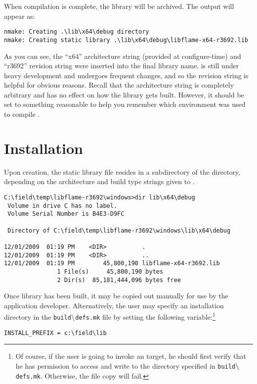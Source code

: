 \noindent
When compilation is complete, the library will be archived.
The output will appear as:

\begin{Verbatim}[frame=single,framesep=2.5mm,xleftmargin=5mm,fontsize=\footnotesize]
nmake: Creating .\lib\x64\debug directory
nmake: Creating static library .\lib\x64\debug\libflame-x64-r3692.lib
\end{Verbatim}

\noindent
As you can see, the ``x64'' architecture string (provided at configure-time)
and ``r3692'' revision string were inserted into the final library name.
\libflame is still under heavy development and undergoes frequent changes, and
so the revision string is helpful for obvious reasons.
Recall that the architecture string is completely arbitrary and has no effect
on how the library gets built.
However, it should be set to something reasonable to help you remember which
environment was used to compile \libflamens.


\section{Installation}


Upon creation, the static library file resides in a subdirectory of the \lib
directory, depending on the architecture and build type strings given to
\configurecmdns.

\begin{Verbatim}[frame=single,framesep=2.5mm,xleftmargin=5mm,fontsize=\footnotesize]
C:\field\temp\libflame-r3692\windows>dir lib\x64\debug
 Volume in drive C has no label.
 Volume Serial Number is B4E3-D9FC

 Directory of C:\field\temp\libflame-r3692\windows\lib\x64\debug

12/01/2009  01:19 PM    <DIR>          .
12/01/2009  01:19 PM    <DIR>          ..
12/01/2009  01:19 PM        45,800,190 libflame-x64-r3692.lib
               1 File(s)     45,800,190 bytes
               2 Dir(s)  85,181,444,096 bytes free
\end{Verbatim}

Once library has been built, it may be copied out manually for use by the
application developer.
Alternatively, the user may specify an installation directory in the
{\tt build$\backslash$defs.mk} file by setting the following variable:\footnote{
Of course, if the user is going to invoke an \install target, he should first
verify that he has permission to access and write to the directory specified
in {\tt build$\backslash$defs.mk}.
Otherwise, the file copy will fail.
}
\begin{Verbatim}[frame=single,framesep=2.5mm,xleftmargin=5mm,fontsize=\footnotesize]
INSTALL_PREFIX = c:\field\lib
\end{Verbatim}


